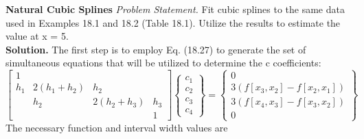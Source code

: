\documentclass[../main.tex]{subfiles}
\begin{document}
   \begin{exmp} \textbf{Natural Cubic Splines }
    \noindent\textit{Problem Statement.} Fit cubic splines to the same data used in Examples 18.1 and 18.2
    (Table 18.1). Utilize the results to estimate the value at x = 5.\\
    \noindent \textbf{Solution.} The first step is to employ Eq. (18.27) to generate the set of simultaneous equations that will be utilized to determine the c coefficients:
    $$
    \left[\begin{array}{cccc}
        1 & & & \\
        h_{1} & 2\left(h_{1}+h_{2}\right) & h_{2} & \\
        & h_{2} & 2\left(h_{2}+h_{3}\right) & h_{3} \\
        & &  & 1
        \end{array}\right]\left\{\begin{array}{l}
        c_{1} \\
        c_{2} \\
        c_{3} \\
        c_{4}
        \end{array}\right\}=\left\{\begin{array}{c}
        0 \\
        3\left(f\left[x_{3}, x_{2}\right]-f\left[x_{2}, x_{1}\right]\right) \\
        3\left(f\left[x_{4}, x_{3}\right]-f\left[x_{3}, x_{2}\right]\right) \\
        0
        \end{array}\right\}
    $$
    The necessary function and interval width values are
    

\end{exmp}
\end{document}
